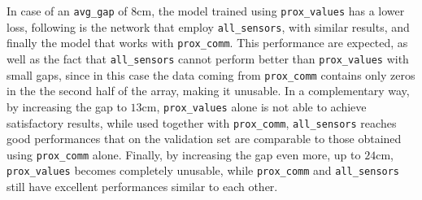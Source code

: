 In case of an \texttt{avg\_gap} of $8$\gls{cm}, the model trained using 
\texttt{prox\_values} has a lower loss, following is the network that employ 
\texttt{all\_sensors}, with similar results, and finally the model that works with 
\texttt{prox\_comm}.
This performance are expected, as well as the fact that \texttt{all\_sensors} cannot 
perform better than \texttt{prox\_values} with small gaps, since in this case the 
data coming from \texttt{prox\_comm} contains only zeros in the the second half 
of the array, making it unusable.
In a complementary way, by increasing the gap to $13$\gls{cm},  
\texttt{prox\_values} alone is not able to achieve satisfactory results, while used 
together with \texttt{prox\_comm}, \texttt{all\_sensors} reaches good 
performances that on the validation set are comparable to those obtained using 
\texttt{prox\_comm} alone.
Finally, by increasing the gap even more, up to $24$\gls{cm}, 
\texttt{prox\_values} becomes completely unusable, while \texttt{prox\_comm} 
and \texttt{all\_sensors} still have excellent performances similar to each other.


